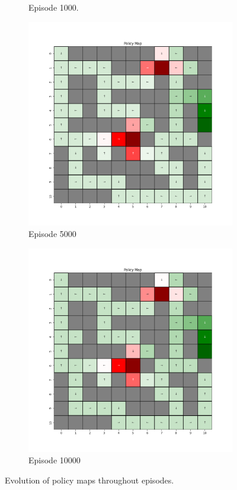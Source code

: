 \documentclass{assignment}
\begin{document}
\begin{figure}[H]
\begin{subfigure}{0.3\textwidth}
    \caption{Episode 1000.}
    \end{subfigure}\hfill
    \begin{subfigure}{0.3\textwidth}
        \includegraphics[width=\textwidth]{figures/policy_td/gamma_sweep/policy_alpha_0.1_gamma_0.75_epsilon_0.2_iteration_5000.png}
    \caption{Episode 5000}
    \end{subfigure}\hfill
    \begin{subfigure}{0.3\textwidth}
        \includegraphics[width=\textwidth]{figures/policy_td/gamma_sweep/policy_alpha_0.1_gamma_0.75_epsilon_0.2_iteration_10000.png}
    \caption{Episode 10000}
    \end{subfigure}
    \caption{Evolution of policy maps throughout episodes.}
    \label{fig:gamma_0.75_td_learning_policy}
\end{figure}
\end{document}
